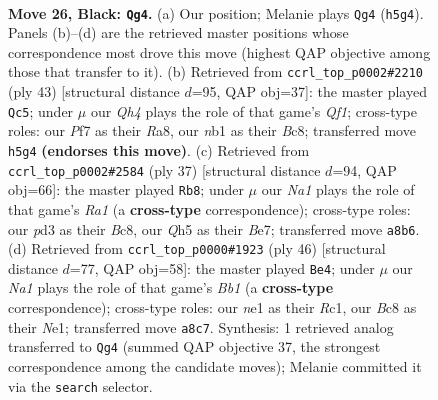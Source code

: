 \documentclass[11pt]{article}
\begin{document}
\clearpage

\begin{figure}[p]\centering
\begin{subfigure}{0.46\textwidth}\centering
\resizebox{\linewidth}{!}{%
\newchessgame
\chessboard[
  setfen={nrbr2k1/5pb1/p6p/2p1p2q/1p2P2n/3P4/PPQB1PB1/RN2NRK1 b - - 1 26},
  showmover=false,
  pgfstyle=straightmove, color=movearrow, markmove={h5-g4}
]}
\caption{}
\end{subfigure}\hfill
\begin{subfigure}{0.46\textwidth}\centering
\resizebox{\linewidth}{!}{%
\newchessgame
\chessboard[
  setfen={r1br1qk1/1p5p/1b2ppp1/p2n4/4B1PQ/2P2N2/1P1B1P1P/3R1RK1 b - - 0 22},
  showmover=false,
  pgfstyle=straightmove, color=movearrow, markmove={f8-c5}
]}
\caption{}
\end{subfigure}
\\[4pt]
\begin{subfigure}{0.46\textwidth}\centering
\resizebox{\linewidth}{!}{%
\newchessgame
\chessboard[
  setfen={r1br2k1/2q1bp1p/p4np1/8/2p1BP2/2N3Q1/PBP3PP/4RR1K b - - 1 19},
  showmover=false,
  pgfstyle=straightmove, color=movearrow, markmove={a8-b8}
]}
\caption{}
\end{subfigure}\hfill
\begin{subfigure}{0.46\textwidth}\centering
\resizebox{\linewidth}{!}{%
\newchessgame
\chessboard[
  setfen={3rrn1k/1bq3pp/1p1bpp2/p7/P1PP4/1Q5P/1B2RPP1/1BR1N1K1 w - - 6 24},
  showmover=false,
  pgfstyle=straightmove, color=movearrow, markmove={b1-e4}
]}
\caption{}
\end{subfigure}
\caption{\textbf{Move 26, Black: \texttt{Qg4}.} (a) Our position; Melanie plays \texttt{Qg4} (\texttt{h5g4}). Panels (b)--(d) are the retrieved master positions whose correspondence most drove this move (highest QAP objective among those that transfer to it). (b) Retrieved from \texttt{ccrl\_top\_p0002\#2210} (ply 43) [structural distance $d$=95, QAP obj=37]: the master played \texttt{Qc5}; under $\mu$ our \emph{Qh4} plays the role of that game's \emph{Qf1}; cross-type roles: our \emph{P}f7 as their \emph{R}a8, our \emph{n}b1 as their \emph{B}c8; transferred move \texttt{h5g4} \textbf{(endorses this move)}. (c) Retrieved from \texttt{ccrl\_top\_p0002\#2584} (ply 37) [structural distance $d$=94, QAP obj=66]: the master played \texttt{Rb8}; under $\mu$ our \emph{Na1} plays the role of that game's \emph{Ra1} (a \textbf{cross-type} correspondence); cross-type roles: our \emph{p}d3 as their \emph{B}c8, our \emph{Q}h5 as their \emph{B}e7; transferred move \texttt{a8b6}. (d) Retrieved from \texttt{ccrl\_top\_p0000\#1923} (ply 46) [structural distance $d$=77, QAP obj=58]: the master played \texttt{Be4}; under $\mu$ our \emph{Na1} plays the role of that game's \emph{Bb1} (a \textbf{cross-type} correspondence); cross-type roles: our \emph{n}e1 as their \emph{R}c1, our \emph{B}c8 as their \emph{N}e1; transferred move \texttt{a8c7}. Synthesis: 1 retrieved analog transferred to \texttt{Qg4} (summed QAP objective 37, the strongest correspondence among the candidate moves); Melanie committed it via the \texttt{search} selector.}
\label{fig:thought-m51}
\end{figure}
\end{document}
